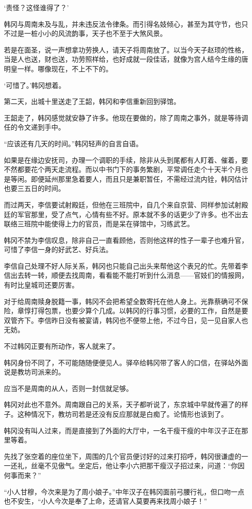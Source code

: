 ‘责怪？这怪谁得了？’

韩冈与周南未及与乱，并未违反法令律条。而引得名妓倾心，甚至为其守节，也只不过是一桩小小的风流韵事，天子也不至于大煞风景。

若是在面圣，说一声想拿功劳换人，请天子将周南放了。以当今天子赵顼的性格，当是人也送，财也送，功劳照样给，也好成就一段佳话，就像为宫人结今生缘的唐明皇一样。哪像现在，不上不下的。

‘可惜了。’韩冈想着。

第二天，出城十里送走了王韶，韩冈和李信重新回到驿馆。

王韶走了，韩冈感觉就安静了许多。他现在要做的，除了周南之事外，就是等待调任的令文递到手中。

“应该还有几天的时间。”韩冈轻声的自言自语。

如果是在缘边安抚司，办理一个调职的手续，除非从头到尾都有人盯着、催着，要不然都要花个两天走流程。而以中书门下的事务繁剧，平常调任走个十天半个月也是等闲。即便延州那里急着要人，而且只是兼职暂任，不需经过流内铨，韩冈估计也要三五日的时间。

而过两天，李信要试射殿廷，但他在三班院中，自几个来自京营、同样参加试射殿廷的军官那里，受了点气，心情有些不好。原本就不多的话更少了许多。也不出去联络三班院中能使得上力的官员，而是呆在驿馆中，习练武艺。

韩冈不禁为李信叹息，除非自己一直看顾他，否则他这样的性子一辈子也难升官，可惜了李信一身的好武艺、好兵法。

李信自己处理不好人际关系，韩冈也只能自己出头来帮他这个表兄的忙。先带着李信出去转一转，顺便去找周南，看看能不能打听到什么消息——官妓们的情报网，有时比皇城司还要厉害。

对于给周南赎身脱籍一事，韩冈不会把希望全数寄托在他人身上。光靠蔡确可不保险，章惇打得包票，也要少算个几成。以韩冈的行事习惯，必要的工作，自然是要双管齐下。李信昨日没有被宴请，韩冈也不便带上他，不过今日，见一见自家人也无妨。

不过韩冈正要有所动作，客人就来了。

韩冈身份不同了，不可能随随便便见人。驿卒给韩冈带了客人的口信，在驿站外面说是教坊司派来的。

应当不是周南的从人，否则一封信就足够。

韩冈对此也不意外。周南跟自己的关系，天子都听说了，东京城中早就传遍了的样子。这种情况下，教坊司若是还没有反应那就是白痴了。论情形也该到了。

韩冈没有叫人过来，而是直接到了外面的大厅中，一名干瘦干瘦的中年汉子正在那里等着。

先找了张空着的座位坐下，周围的几个官员便讨好的过来打招呼，韩冈很谦虚的一一还礼，丝毫不见傲气。坐定后，他让李小六把那干瘦汉子招过来，问道：“你因何事而来？”

“小人甘穆，今次来是为了周小娘子。”中年汉子在韩冈面前弓腰行礼，但口吻一点也不安生，“小人今次是奉了上命，还请官人莫要再来找周小娘子！”

